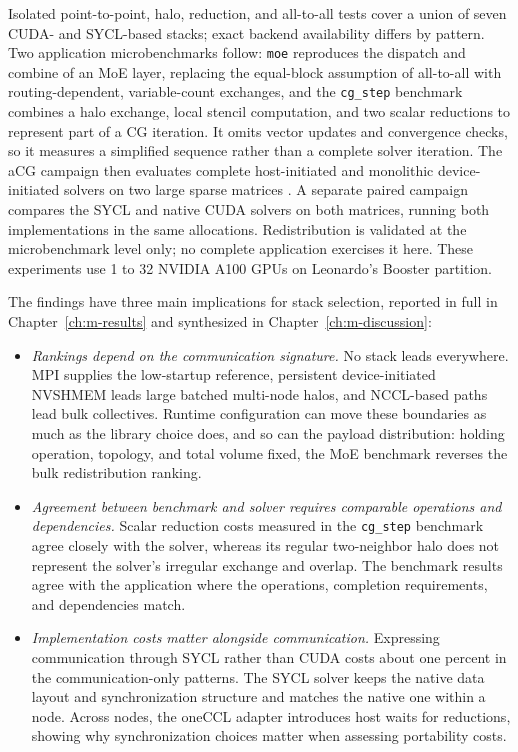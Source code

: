 Isolated point-to-point, halo, reduction, and all-to-all tests cover a union of seven CUDA- and SYCL-based stacks; exact backend availability differs by pattern. Two application microbenchmarks follow: \texttt{moe} reproduces the dispatch and combine of an MoE layer, replacing the equal-block assumption of all-to-all with routing-dependent, variable-count exchanges, and the \texttt{cg\_step} benchmark combines a halo exchange, local stencil computation, and two scalar reductions to represent part of a CG iteration. It omits vector updates and convergence checks, so it measures a simplified sequence rather than a complete solver iteration. The aCG campaign then evaluates complete host-initiated and monolithic device-initiated solvers on two large sparse matrices \cite{trotter_cpu-_2025}. A separate paired campaign compares the SYCL and native CUDA solvers on both matrices, running both implementations in the same allocations. Redistribution is validated at the microbenchmark level only; no complete application exercises it here. These experiments use 1 to 32 NVIDIA A100 GPUs on Leonardo's Booster partition.

The findings have three main implications for stack selection, reported in full in Chapter~\ref{ch:m-results} and synthesized in Chapter~\ref{ch:m-discussion}:
\begin{itemize}
\item \emph{Rankings depend on the communication signature.} No stack leads everywhere. MPI supplies the low-startup reference, persistent device-initiated NVSHMEM leads large batched multi-node halos, and NCCL-based paths lead bulk collectives. Runtime configuration can move these boundaries as much as the library choice does, and so can the payload distribution: holding operation, topology, and total volume fixed, the MoE benchmark reverses the bulk redistribution ranking.
\item \emph{Agreement between benchmark and solver requires comparable operations and dependencies.} Scalar reduction costs measured in the \texttt{cg\_step} benchmark agree closely with the solver, whereas its regular two-neighbor halo does not represent the solver's irregular exchange and overlap. The benchmark results agree with the application where the operations, completion requirements, and dependencies match.
\item \emph{Implementation costs matter alongside communication.} Expressing communication through SYCL rather than CUDA costs about one percent in the communication-only patterns. The SYCL solver keeps the native data layout and synchronization structure and matches the native one within a node. Across nodes, the oneCCL adapter introduces host waits for reductions, showing why synchronization choices matter when assessing portability costs.
\end{itemize}

